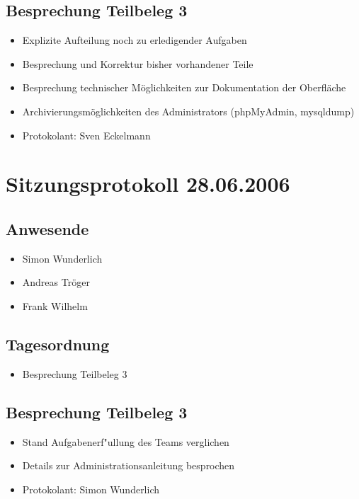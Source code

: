 			\subsection{Besprechung Teilbeleg 3}
			\begin{itemize}
				\item Explizite Aufteilung noch zu erledigender Aufgaben
				\item Besprechung und Korrektur bisher vorhandener Teile
				\item Besprechung technischer Möglichkeiten zur Dokumentation der Oberfläche
				\item Archivierungsmöglichkeiten des Administrators (phpMyAdmin, mysqldump)
			\end{itemize}
		\begin{itemize}
			\item Protokolant: Sven Eckelmann
		\end{itemize}
\newpage
		\section{Sitzungsprotokoll 28.06.2006}
		\subsection{Anwesende}
		\begin{itemize}
			\item Simon Wunderlich
			\item Andreas Tröger
			\item Frank Wilhelm
		\end{itemize}
		\subsection{Tagesordnung}
		\begin{itemize}
			\item Besprechung Teilbeleg 3
		\end{itemize}
			\subsection{Besprechung Teilbeleg 3}
			\begin{itemize}
				\item Stand Aufgabenerf"ullung des Teams verglichen
				\item Details zur Administrationsanleitung besprochen
			\end{itemize}
		\begin{itemize}
			\item Protokolant: Simon Wunderlich
		\end{itemize}
\newpage

